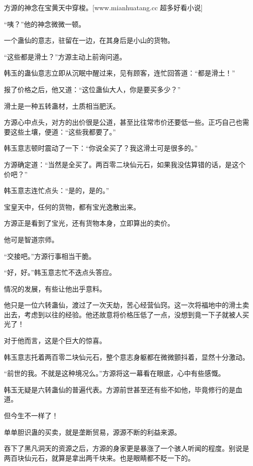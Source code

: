 
\begin{this_body}

方源的神念在宝黄天中穿梭。[www.mianhuatang.cc 超多好看小说]

“咦？”他的神念微微一顿。

一个蛊仙的意志，驻留在一边，在其身后是小山的货物。

“这些都是滑土？”方源主动上前询问道。

韩玉的蛊仙意志立即从沉眠中醒过来，见有顾客，连忙回答道：“都是滑土！”

报了价格之后，他又道：“这位蛊仙大人，你是要买多少？”

滑土是一种五转蛊材，土质相当肥沃。

方源心中点头，对方的出价很是公道，甚至比往常市价还要低一些。正巧自己也需要这些土壤，便道：“这些我都要了。”

韩玉意志顿时震动了一下：“你说全买了？我这滑土可是很多的。”

方源确定道：“当然是全买了。两百零二块仙元石，如果我没估算错的话，是这个价吧？”

韩玉意志连忙点头：“是的，是的。”

宝皇天中，任何的货物，都有宝光逸散出来。

方源正是看到了宝光，还有货物本身，立即算出的卖价。

他可是智道宗师。

“交接吧。”方源行事相当干脆。

“好，好。”韩玉意志忙不迭点头答应。

情况的发展，有些让他出乎意料。

他只是一位六转蛊仙，渡过了一次天劫，苦心经营仙窍。这一次将福地中的滑土卖出去，考虑到以往的经验。他还故意将价格压低了一点，没想到竟一下子就被人买光了！

对于他而言，这是个巨大的惊喜。

韩玉意志托着两百零二块仙元石，整个意志身躯都在微微颤抖着，显然十分激动。

“前世的我。不就是这种境况么。”方源将这一幕看在眼底，心中有些感慨。

韩玉无疑是六转蛊仙的普遍代表。方源前世甚至还有些不如他，毕竟修行的是血道。

但今生不一样了！

单单胆识蛊的买卖，就是垄断贸易，源源不断的利益来源。

吞下了黑凡洞天的资源之后，方源的身家更是暴涨了一个骇人听闻的程度。别说是两百块仙元石，就算是拿出两千块来。也是眼睛都不眨一下的。


\end{this_body}
